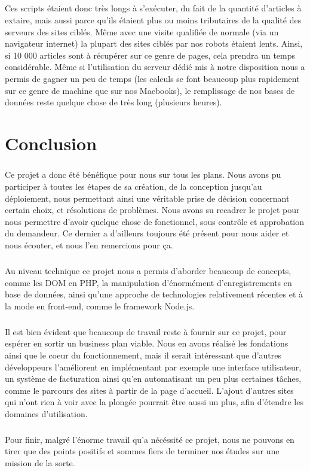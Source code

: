 \documentclass{report}
\begin{document}
\paragraph{}
Ces scripts étaient donc très longs à s'exécuter, du fait de la quantité d'articles à extaire, mais aussi parce qu'ils étaient plus ou moins tributaires de la qualité des serveurs des sites ciblés. Même avec une visite qualifiée de normale (via un navigateur internet) la plupart des sites ciblés par nos robots étaient lents. Ainsi, si 10 000 articles sont à récupérer sur ce genre de pages, cela prendra un temps considérable. Même si l'utilisation du serveur dédié mis à notre disposition nous a permis de gagner un peu de temps (les calculs se font beaucoup plus rapidement sur ce genre de machine que sur nos Macbooks), le remplissage de nos bases de données reste quelque chose de très long (plusieurs heures).


\chapter{Conclusion}

\paragraph{}
Ce projet a donc été bénéfique pour nous sur tous les plans. Nous avons pu participer à toutes les étapes de sa création, de la conception jusqu'au déploiement, nous permettant ainsi une véritable prise de décision concernant certain choix,  et résolutions de problèmes. Nous avons su recadrer le projet pour nous permettre d'avoir quelque chose de fonctionnel, sous contrôle et approbation du demandeur. Ce dernier a d'ailleurs toujours été présent pour nous aider et nous écouter, et nous l'en remercions pour ça.

\paragraph{}
Au niveau technique ce projet nous a permis d'aborder beaucoup de concepts, comme les DOM en PHP, la manipulation d'énormément d'enregistrements en base de données, ainsi qu'une approche de technologies relativement récentes et à la mode en front-end, comme le framework Node.js.

\paragraph{}
Il est bien évident que beaucoup de travail reste à fournir sur ce projet, pour espérer en sortir un business plan viable. Nous en avons réalisé les fondations ainsi que le coeur du fonctionnement, mais il serait intéressant que d'autres développeurs l'améliorent en implémentant par exemple une interface utilisateur, un système de facturation ainsi qu'en automatisant un peu plus certaines tâches, comme le parcours des sites à partir de la page d'accueil. L'ajout d'autres sites qui n'ont rien à voir avec la plongée pourrait être aussi un plus, afin d'étendre les domaines d'utilisation.

\paragraph{}
Pour finir, malgré l'énorme travail qu'a nécéssité ce projet, nous ne pouvons en tirer que des points positifs et sommes fiers de terminer nos études sur une mission de la sorte.\\
\end{document}
